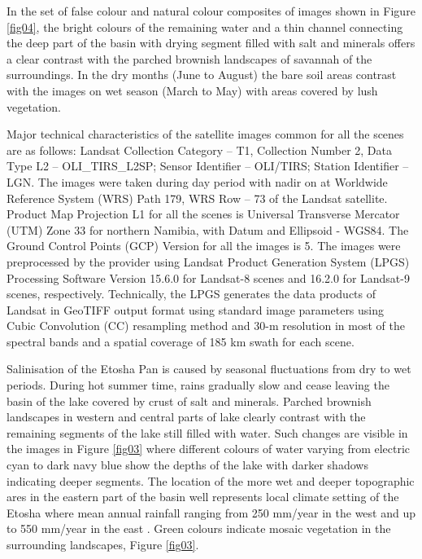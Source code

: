 \documentclass[climate,article,submit,pdftex,moreauthors]{Definitions/mdpi}
\begin{document}
\pagebreak
In the set of false colour and natural colour composites of images shown in Figure \ref{fig04}, the bright colours of the remaining water and a thin channel connecting the deep part of the basin with drying segment filled with salt and minerals offers a clear contrast with the parched brownish landscapes of savannah of the surroundings. In the dry months (June to August) the bare soil areas contrast with the images on wet season (March to May) with areas covered by lush vegetation. 

Major technical characteristics of the satellite images common for all the scenes are as follows: Landsat Collection Category -- T1, Collection Number 2, Data Type L2 -- OLI\_TIRS\_L2SP; Sensor Identifier -- OLI/TIRS; Station Identifier -- LGN. The images were taken during day period with nadir on at Worldwide Reference System (WRS) Path 179, WRS Row -- 73 of the Landsat satellite. Product Map Projection L1 for all the scenes is Universal Transverse Mercator (UTM) Zone 33 for northern Namibia, with Datum and Ellipsoid - WGS84. The Ground Control Points (GCP) Version for all the images is 5. The images were preprocessed by the provider using Landsat Product Generation System (LPGS) Processing Software Version 15.6.0 for Landsat-8 scenes and 16.2.0 for Landsat-9 scenes, respectively. Technically, the LPGS generates the data products of Landsat in GeoTIFF output format using standard image parameters using Cubic Convolution (CC) resampling method and 30-m resolution in most of the spectral bands and a spatial coverage of 185 km swath for each scene. 

Salinisation of the Etosha Pan is caused by seasonal fluctuations from dry to wet periods. During hot summer time, rains gradually slow and cease leaving the basin of the lake covered by crust of salt and minerals. Parched brownish landscapes in western and central parts of lake clearly contrast with the remaining segments of the lake still filled with water. Such changes are visible in the images in Figure \ref{fig03} where different colours of water varying from electric cyan to dark navy blue show the depths of the lake with darker shadows indicating deeper segments. The location of the more wet and deeper topographic ares in the eastern part of the basin well represents local climate setting of the Etosha where mean annual rainfall ranging from 250 mm/year in the west and up to 550 mm/year in the east \cite{Koeniger}. Green colours indicate mosaic vegetation in the surrounding landscapes, Figure \ref{fig03}. 
\end{document}
